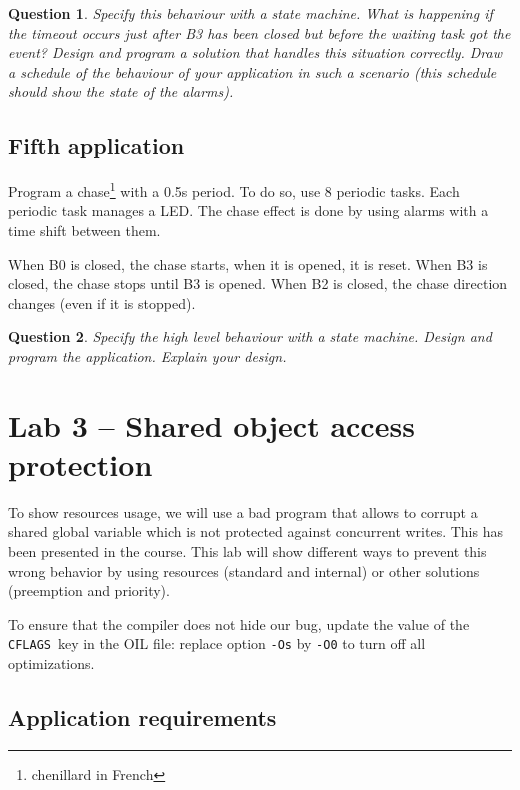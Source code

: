 \documentclass[11pt]{report}
\newtheorem{ex}{Question}
\begin{document}
\begin{ex}
    Specify this behaviour with a state machine.
    What is happening if the timeout occurs just after B3 has been closed but before the waiting task got the event?
    Design and program a solution that handles this situation correctly.
    Draw a schedule of the behaviour of your application in such a scenario (this schedule should show the state of the alarms).
\end{ex}

\section{Fifth application}

Program a chase\footnote{chenillard in French} with a 0.5s period. To do so, use 8 periodic tasks. Each periodic task manages a LED. The chase effect is done by using alarms with a time shift between them.

When B0 is closed, the chase starts, when it is opened, it is reset.
When B3 is closed, the chase stops until B3 is opened.
When B2 is closed, the chase direction changes (even if it is stopped).

\begin{ex}
    Specify the high level behaviour with a state machine.
    Design and program the application.
    Explain your design.
\end{ex}

\chapter{Lab 3 -- Shared object access protection}

To show resources usage, we will use a bad program that allows to corrupt a shared global variable which is not protected against concurrent writes. This has been presented in the course. This lab will show different ways to prevent this wrong behavior by using resources (standard and internal) or other solutions (preemption and priority).

To ensure that the compiler does not hide our bug, update the value of the \texttt{CFLAGS} key in the OIL file: replace option \texttt{-Os} by \texttt{-O0} to turn off all optimizations.

\section{Application requirements}
\end{document}
